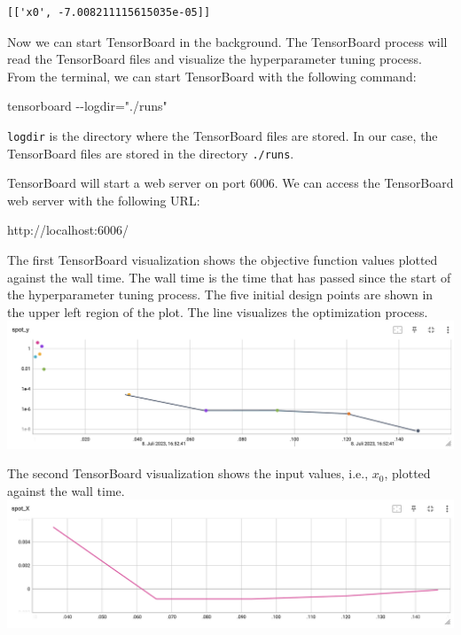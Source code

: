 \documentclass[
  letterpaper,
  DIV=11,
  numbers=noendperiod]{scrreprt}
\newenvironment{Shaded}{\begin{snugshade}}{\end{snugshade}}
\newcommand{\NormalTok}[1]{\textcolor[rgb]{0.00,0.23,0.31}{#1}}
\begin{document}
\begin{verbatim}
[['x0', -7.008211115615035e-05]]
\end{verbatim}

Now we can start TensorBoard in the background. The TensorBoard process
will read the TensorBoard files and visualize the hyperparameter tuning
process. From the terminal, we can start TensorBoard with the following
command:

\begin{Shaded}
\begin{Highlighting}[]
\NormalTok{tensorboard {-}{-}logdir="./runs"}
\end{Highlighting}
\end{Shaded}

\texttt{logdir} is the directory where the TensorBoard files are stored.
In our case, the TensorBoard files are stored in the directory
\texttt{./runs}.

TensorBoard will start a web server on port 6006. We can access the
TensorBoard web server with the following URL:

\begin{Shaded}
\begin{Highlighting}[]
\NormalTok{http://localhost:6006/}
\end{Highlighting}
\end{Shaded}

The first TensorBoard visualization shows the objective function values
plotted against the wall time. The wall time is the time that has passed
since the start of the hyperparameter tuning process. The five initial
design points are shown in the upper left region of the plot. The line
visualizes the optimization process.
\includegraphics{figures_static/01_tensorboard_01.png}

The second TensorBoard visualization shows the input values, i.e.,
\(x_0\), plotted against the wall time.
\includegraphics{figures_static/01_tensorboard_02.png}
\end{document}
